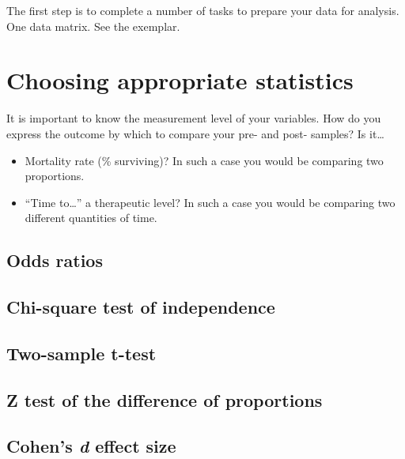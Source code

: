 \documentclass[
]{report}
\providecommand{\tightlist}{%
  \setlength{\itemsep}{0pt}\setlength{\parskip}{0pt}}
\begin{document}
The first step is to complete a number of tasks to prepare your data for
analysis. One data matrix. See the exemplar.

\hypertarget{choosing-appropriate-statistics}{%
\section{Choosing appropriate
statistics}\label{choosing-appropriate-statistics}}

It is important to know the measurement level of your variables. How do
you express the outcome by which to compare your pre- and post- samples?
Is it\ldots{}

\begin{itemize}
\tightlist
\item
  Mortality rate (\% surviving)? In such a case you would be comparing
  two proportions.
\item
  ``Time to\ldots{}'' a therapeutic level? In such a case you would be
  comparing two different quantities of time.
\end{itemize}

\hypertarget{odds-ratios}{%
\subsection{Odds ratios}\label{odds-ratios}}

\hypertarget{chi-square-test-of-independence}{%
\subsection{Chi-square test of
independence}\label{chi-square-test-of-independence}}

\hypertarget{two-sample-t-test}{%
\subsection{Two-sample t-test}\label{two-sample-t-test}}

\hypertarget{z-test-of-the-difference-of-proportions}{%
\subsection{Z test of the difference of
proportions}\label{z-test-of-the-difference-of-proportions}}

\hypertarget{cohens-d-effect-size}{%
\subsection{\texorpdfstring{Cohen's \emph{d} effect
size}{Cohen's d effect size}}\label{cohens-d-effect-size}}
\end{document}
